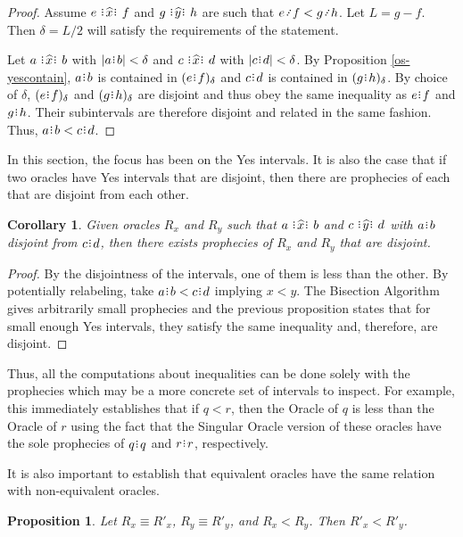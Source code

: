 \documentclass[12pt]{article}
\newtheorem{corollary}{Corollary}[section]
\newtheorem{proposition}{Proposition}[section]
\begin{document}
\begin{proof}
    Assume $e \xora f$ and $g \xora[y] h$ are such that $e\lte f < g \lte h$. Let $L = g-f$. Then $\delta = L/2$ will satisfy the requirements of the statement. 

    Let $a \xora b$ with $|a\rint b| < \delta$ and $c \xora d$ with $|c\rint d| < \delta$. By Proposition \ref{os-yescontain}, $a\rint b$ is contained in $\halo{e\rint f}$ and $c\rint d$ is contained in $\halo{g\rint h}$. By choice of $\delta$, $\halo{e\rint f}$ and $\halo{g\rint h}$ are disjoint and thus obey the same inequality as $e\rint f$ and $g\rint h$. Their subintervals are therefore disjoint and related in the same fashion. Thus, $a\rint b < c\rint d$. 
\end{proof}

In this section, the focus has been on the Yes intervals. It is also the case that if two oracles have Yes intervals that are disjoint, then there are prophecies of each that are disjoint from each other.

\begin{corollary}
    Given oracles $R_x$ and $R_y$ such that $a \xora b$ and $c \xora[y] d$ with $a\rint b$ disjoint from $c\rint d$, then there exists prophecies of $R_x$ and $R_y$ that are disjoint. 
\end{corollary}

\begin{proof}
    By the disjointness of the intervals, one of them is less than the other. By potentially relabeling, take $a\rint b < c\rint d$ implying $x < y$. The Bisection Algorithm gives arbitrarily small prophecies and the previous proposition states that for small enough Yes intervals, they satisfy the same inequality and, therefore, are disjoint. 
\end{proof}

Thus, all the computations about inequalities can be done solely with the prophecies which may be a more concrete set of intervals to inspect. For example, this immediately establishes that if $q < r$, then the Oracle of $q$ is less than the Oracle of $r$ using the fact that the Singular Oracle version of these oracles have the sole prophecies of $q\rint q$ and $r\rint r$, respectively. 

It is also important to establish that equivalent oracles have the same relation with non-equivalent oracles. 

\begin{proposition}
    Let $R_x \equiv R'_{x}$, $R_y \equiv R'_{y}$, and $R_x < R_y$. Then $R'_{x} < R'_{y}$.
\end{proposition}
\end{document}
